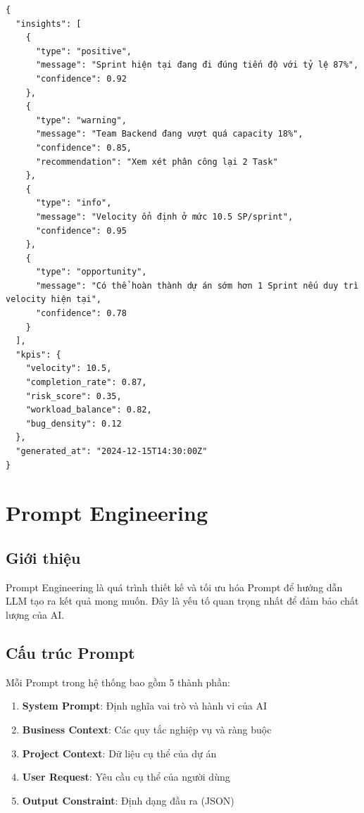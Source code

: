 \documentclass[12pt,a4paper]{report}
\begin{document}
\begin{verbatim}
{
  "insights": [
    {
      "type": "positive",
      "message": "Sprint hiện tại đang đi đúng tiến độ với tỷ lệ 87%",
      "confidence": 0.92
    },
    {
      "type": "warning",
      "message": "Team Backend đang vượt quá capacity 18%",
      "confidence": 0.85,
      "recommendation": "Xem xét phân công lại 2 Task"
    },
    {
      "type": "info",
      "message": "Velocity ổn định ở mức 10.5 SP/sprint",
      "confidence": 0.95
    },
    {
      "type": "opportunity",
      "message": "Có thể hoàn thành dự án sớm hơn 1 Sprint nếu duy trì velocity hiện tại",
      "confidence": 0.78
    }
  ],
  "kpis": {
    "velocity": 10.5,
    "completion_rate": 0.87,
    "risk_score": 0.35,
    "workload_balance": 0.82,
    "bug_density": 0.12
  },
  "generated_at": "2024-12-15T14:30:00Z"
}
\end{verbatim}

\section{Prompt Engineering}

\subsection{Giới thiệu}

Prompt Engineering là quá trình thiết kế và tối ưu hóa Prompt để hướng dẫn LLM tạo ra kết quả mong muốn. Đây là yếu tố quan trọng nhất để đảm bảo chất lượng của AI.

\subsection{Cấu trúc Prompt}

Mỗi Prompt trong hệ thống bao gồm 5 thành phần:

\begin{enumerate}
\item \textbf{System Prompt}: Định nghĩa vai trò và hành vi của AI
\item \textbf{Business Context}: Các quy tắc nghiệp vụ và ràng buộc
\item \textbf{Project Context}: Dữ liệu cụ thể của dự án
\item \textbf{User Request}: Yêu cầu cụ thể của người dùng
\item \textbf{Output Constraint}: Định dạng đầu ra (JSON)
\end{enumerate}
\end{document}
